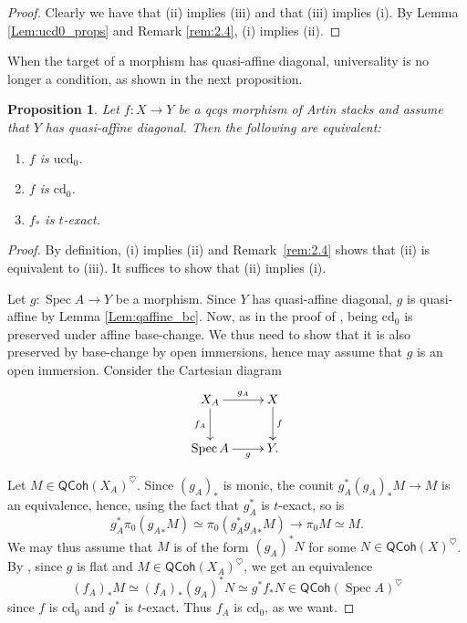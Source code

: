 \documentclass[a4paper,twoside,11pt]{amsart}
\theoremstyle{plain}
\newtheorem{proposition}[theorem]{Proposition}
\theoremstyle{definition}
\theoremstyle{remark}
\numberwithin{equation}{section}
\newcommand{\cd}{\mathrm{cd}}
\newcommand{\ucd}{$\mathrm{ucd}_{0}$\xspace}
\renewcommand{\cd}{$\mathrm{cd}_{0}$\xspace}
\DeclareMathOperator{\Spec}{Spec} %
\newcommand{\QCoh}{\mathsf{QCoh}}
\begin{document}
\begin{proof}
    Clearly we have that (ii) implies (iii) and that (iii) implies (i). By Lemma \ref{Lem:ucd0_props} and Remark \ref{rem:2.4}, (i) implies (ii).   
\end{proof}

When the target of a morphism has quasi-affine diagonal, universality is no longer a condition, as shown in the next proposition.

\begin{proposition} \label{Prop:quasi-aff_cd_ucd_$t$-exact}
    Let $f \colon X \to Y$ be a qcqs morphism of Artin stacks and assume that $Y$ has quasi-affine diagonal. Then the following are equivalent:
    \begin{enumerate}
        \item $f$ is \ucd.
        \item $f$ is \cd.
        \item $f_*$ is $t$-exact.
    \end{enumerate}
\end{proposition}

\begin{proof}
    By definition, (i) implies (ii) and Remark~\ref{rem:2.4} shows that (ii) is equivalent to (iii). It suffices to show that (ii) implies (i).
    
    Let $g \colon \Spec A \to Y$ be a morphism. Since $Y$ has quasi-affine diagonal, $g$ is quasi-affine by Lemma \ref{Lem:qaffine_bc}. Now, as in the proof of \cite[Prop.~A.1.9]{HalpernleistnerMapping}, being \cd is preserved under affine base-change. We thus need to show that it is also preserved by base-change by open immersions, hence may assume that $g$ is an open immersion. Consider the Cartesian diagram
    \begin{align*}
        \xymatrix{
        X_A \ar[d]_-{f_A} \ar[r]^-{g_A} & X \ar[d]^-f \\
        \Spec A \ar[r]_-{g} & Y.
        }
    \end{align*}
    
    Let $M \in \QCoh(X_A)^{\heartsuit}$. Since $(g_A)_*$ is monic, the counit $g_A^*({g_A})_* M \to M$ is an equivalence, hence, using the fact that $g_A^\ast$ is $t$-exact, so is
    \[ g_A^*\pi_0 ( {g_A}_* M ) \simeq \pi_0 (g_A^*{g_A}_* M ) \to \pi_0 M \simeq M. \]
    We may thus assume that $M$ is of the form $(g_A)^\ast N$ for some $N \in \QCoh(X)^{\heartsuit}$. By \cite[Lemma~A.1.3]{HalpernleistnerMapping}, since $g$ is flat and $M \in \QCoh(X_A)^{\heartsuit}$, we get an equivalence 
    $$ (f_A)_\ast M \simeq (f_A)_\ast (g_A)^\ast N \simeq g^\ast f_\ast N \in \QCoh(\Spec A)^{\heartsuit} $$
    since $f$ is \cd and $g^\ast$ is $t$-exact. Thus $f_A$ is \cd, as we want.
\end{proof}
\end{document}
